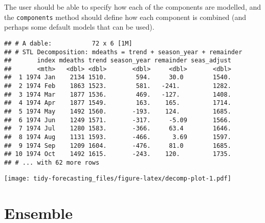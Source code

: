 \documentclass[]{book}
\newenvironment{Shaded}{\begin{snugshade}}{\end{snugshade}}
\newcommand{\DataTypeTok}[1]{\textcolor[rgb]{0.13,0.29,0.53}{#1}}
\newcommand{\DecValTok}[1]{\textcolor[rgb]{0.00,0.00,0.81}{#1}}
\newcommand{\KeywordTok}[1]{\textcolor[rgb]{0.13,0.29,0.53}{\textbf{#1}}}
\newcommand{\NormalTok}[1]{#1}
\newcommand{\OperatorTok}[1]{\textcolor[rgb]{0.81,0.36,0.00}{\textbf{#1}}}
\newcommand{\StringTok}[1]{\textcolor[rgb]{0.31,0.60,0.02}{#1}}
\begin{document}
The user should be able to specify how each of the components are modelled, and the \texttt{components} method should define how each component is combined (and perhaps some default models that can be used).

\begin{Shaded}
\end{Shaded}

\begin{verbatim}
## # A dable:           72 x 6 [1M]
## # STL Decomposition: mdeaths = trend + season_year + remainder
##       index mdeaths trend season_year remainder seas_adjust
##       <mth>   <dbl> <dbl>       <dbl>     <dbl>       <dbl>
##  1 1974 Jan    2134 1510.        594.     30.0        1540.
##  2 1974 Feb    1863 1523.        581.   -241.         1282.
##  3 1974 Mar    1877 1536.        469.   -127.         1408.
##  4 1974 Apr    1877 1549.        163.    165.         1714.
##  5 1974 May    1492 1560.       -193.    124.         1685.
##  6 1974 Jun    1249 1571.       -317.     -5.09       1566.
##  7 1974 Jul    1280 1583.       -366.     63.4        1646.
##  8 1974 Aug    1131 1593.       -466.      3.69       1597.
##  9 1974 Sep    1209 1604.       -476.     81.0        1685.
## 10 1974 Oct    1492 1615.       -243.    120.         1735.
## # ... with 62 more rows
\end{verbatim}

\texttt{[image: tidy-forecasting\_files/figure-latex/decomp-plot-1.pdf]}

\begin{Shaded}
\end{Shaded}

\hypertarget{ensemble}{%
\section{Ensemble}\label{ensemble}}
\end{document}
